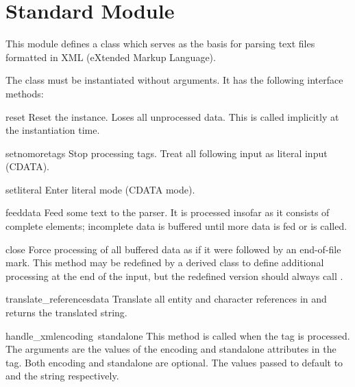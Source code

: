 \section{Standard Module }
\label{module-xmllib}

This module defines a class  which serves as the basis 
for parsing text files formatted in XML (eXtended Markup Language).

The  class must be instantiated without arguments.  It 
has the following interface methods:

\renewcommand{\indexsubitem}{(XMLParser method)}

\begin{funcdesc}{reset}{}
Reset the instance.  Loses all unprocessed data.  This is called
implicitly at the instantiation time.
\end{funcdesc}

\begin{funcdesc}{setnomoretags}{}
Stop processing tags.  Treat all following input as literal input
(CDATA).
\end{funcdesc}

\begin{funcdesc}{setliteral}{}
Enter literal mode (CDATA mode).
\end{funcdesc}

\begin{funcdesc}{feed}{data}
Feed some text to the parser.  It is processed insofar as it consists
of complete elements; incomplete data is buffered until more data is
fed or  is called.
\end{funcdesc}

\begin{funcdesc}{close}{}
Force processing of all buffered data as if it were followed by an
end-of-file mark.  This method may be redefined by a derived class to
define additional processing at the end of the input, but the
redefined version should always call .
\end{funcdesc}

\begin{funcdesc}{translate_references}{data}
Translate all entity and character references in  and
returns the translated string.
\end{funcdesc}

\begin{funcdesc}{handle_xml}{encoding\, standalone}
This method is called when the  tag is processed.
The arguments are the values of the encoding and standalone attributes 
in the tag.  Both encoding and standalone are optional.  The values
passed to  default to  and the string
 respectively.
\end{funcdesc}

